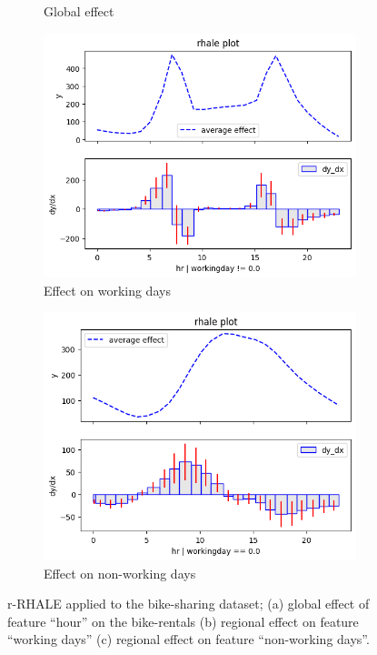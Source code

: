 \documentclass[
twocolumn,
]{ceurart}
\begin{document}
\begin{figure}
\begin{subfigure}[t]{0.24\textwidth}
  \caption{Global effect}
  \label{subfig:global}
  \end{subfigure}
  \begin{subfigure}[t]{0.24\textwidth}
  \centering
  \includegraphics[width=\linewidth]{figures/running_example/01_bike_sharing_dataset_29_1.png}
  \caption{Effect on working days}
  \label{subfig:regional_a}
  \end{subfigure}
  \begin{subfigure}[t]{0.24\textwidth}
  \centering  
  \includegraphics[width=\linewidth]{figures/running_example/01_bike_sharing_dataset_29_0.png}
  \caption{Effect on non-working days}
  \label{subfig:regional_b}
  \end{subfigure}
  \caption{r-RHALE applied to the bike-sharing dataset; (a) global effect of feature ``hour'' on the bike-rentals (b) regional effect on feature ``working days'' (c) regional effect on feature ``non-working days''.}
  \label{fig:main-concept}
\end{figure}
\end{document}
